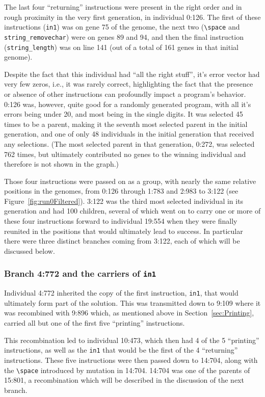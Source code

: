 \documentclass[graybox]{svmult}
\begin{document}
The last four ``returning'' instructions were present in the right order and in 
rough proximity in the very first generation, in individual 0:126. The first of these instructions (\texttt{in1}) was on gene 75 of the genome, the next two
(\texttt{\textbackslash space} and \texttt{string\_removechar}) were on 
genes 89 and 94, and then the final instruction (\texttt{string\_length}) 
was on line 141 (out of a total of 161 genes in that initial genome).

Despite the fact that this individual had ``all the right stuff'', it's error
vector had very few zeros, i.e., it was rarely correct, highlighting
the fact that the presence or absence of other instructions can profoundly
impact a program's behavior. 0:126 was, however, quite good for a randomly
generated program, with all it's errors being under 20, and most being in
the single digits. It was selected 45 times to be a parent, making it the
seventh most selected parent in the initial generation, and one of only 48
individuals in the initial generation that received any selections. 
(The most selected
parent in that generation, 0:272, was selected 762 times, but ultimately
contributed no genes to the winning individual and therefore is not shown in the graph.)

Those four instructions were passed on as a group, with nearly the same 
relative positions in the genomes, from 0:126 through 1:783 and 2:983 
to 3:122 (see Figure~\ref{fig:run0Filtered}). 
3:122 was the third most selected individual in its generation
and had 100 children, several of which went on to carry one or more of
these four instructions forward to individual 19:554 when they were finally
reunited in the positions that would ultimately lead to success. In particular
there were three distinct branches coming from 3:122, each of which will
be discussed below.

\subsubsection{Branch 4:772 and the carriers of \texttt{in1}}
\label{sec:4:772}

Individual 4:772 inherited the copy of the first instruction,
\texttt{in1}, that would ultimately form part of the solution. This was
transmitted down to 9:109 where it was recombined with 
9:896 which, as mentioned above in Section~\ref{sec:Printing}, carried
all but one of the first five ``printing'' instructions. 

This recombination
led to individual 10:473, which then had 4 of the 5 ``printing'' instructions,
as well as the \texttt{in1} that would be the first of the 4 ``returning''
instructions. These five instructions were then passed down to 14:704, 
along with the 
\texttt{\textbackslash space} introduced by mutation in 14:704. 14:704 was
one of the parents of 15:801, a recombination which will be described in the
discussion of the next branch.
\end{document}

